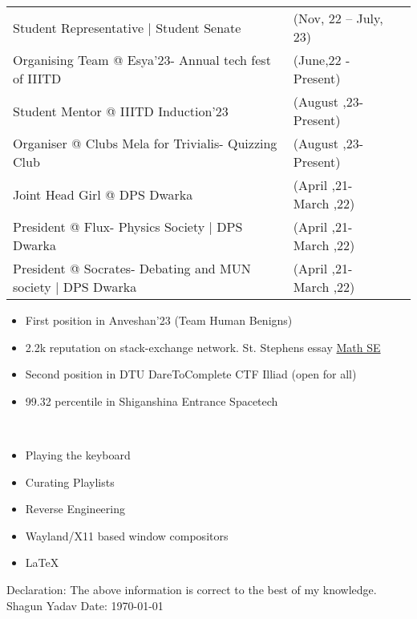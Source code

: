 \documentclass[10pt]{extarticle}
\newcommand{\yourname}{Shagun Yadav}%
\begin{document}
\vspace{0pt}
\begin{contained}
\begin{longtable}{p{}p{}p{}}
    Student Representative | Student Senate & (Nov, 22 – July, 23)\\
    Organising Team @ Esya'23- Annual tech fest of IIITD & (June,22 - Present)\\
    Student Mentor @ IIITD Induction'23 & (August ,23- Present)\\
    Organiser @ Clubs Mela for Trivialis- Quizzing Club & (August ,23- Present)\\
    Joint Head Girl @ DPS Dwarka & (April ,21- March ,22)\\
    President @ Flux- Physics Society | DPS Dwarka & (April ,21- March ,22)\\
    President @ Socrates- Debating and MUN society | DPS Dwarka & (April ,21- March ,22)\\
    
\end{longtable}
\vspace{0pt}
\end{contained}
\begin{contained}
\vspace{0pt}
\begin{itemize}
    \setlength\itemsep{0.5pt}
    \item First position in Anveshan'23 (Team Human Benigns)
    \item 2.2k reputation on stack-exchange network. St. Stephens essay \href{https://math.stackexchange.com/users/811225}{\color{red!70} Math SE}
    \item Second position in DTU DareToComplete CTF Illiad (open for all)
    \item 99.32 percentile in Shiganshina Entrance Spacetech
\end{itemize}
\vspace{0pt}
\end{contained}
\begin{contained}\\
\begin{itemize}
    \setlength\itemsep{0.5pt}
    \item Playing the keyboard
    \item Curating Playlists
    \item Reverse Engineering
    \item Wayland/X11 based window compositors
    \item \LaTeX
\end{itemize}
\end{contained}
Declaration: The above information is correct to the best of my knowledge.\newline
\yourname\newline
Date: \today
\end{document}

